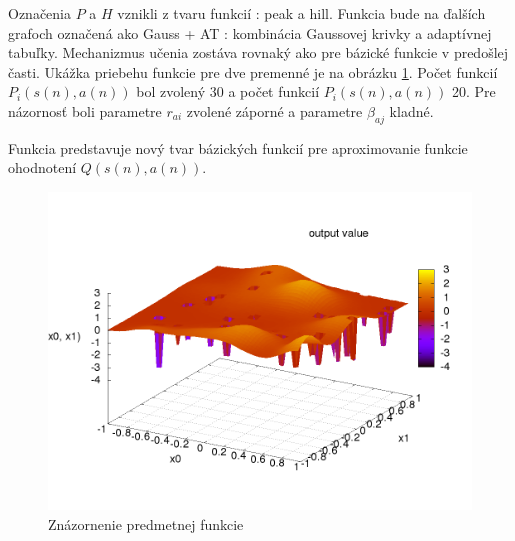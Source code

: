 Označenia $P$ a $H$ vznikli z tvaru funkcií : peak a hill. Funkcia bude na ďalších
grafoch označená ako Gauss + AT : kombinácia Gaussovej krivky a adaptívnej tabuľky.
Mechanizmus učenia zostáva rovnaký ako pre bázické funkcie v predošlej časti. Ukážka
priebehu funkcie pre dve premenné je na obrázku \ref{img:peak_hill_funcion}.
Počet funkcií $P_i(s(n), a(n))$ bol zvolený 30 a počet funkcií $P_i(s(n), a(n))$ 20.
Pre názornosť boli parametre $r_{ai}$ zvolené záporné a parametre $\beta_{aj}$ kladné.

Funkcia \label{eq:peak_hill} predstavuje nový tvar bázických funkcií pre
aproximovanie funkcie ohodnotení $Q(s(n), a(n))$.

\begin{figure}[]
\center
\includegraphics[scale=.5]{../pictures/peak_hill_function.png}
\caption{Znázornenie predmetnej funkcie}
\label{img:peak_hill_funcion}
\end{figure}
